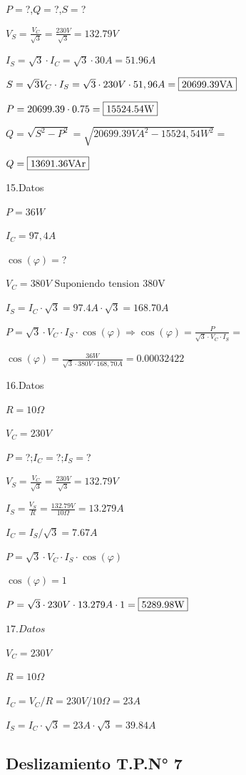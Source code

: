 \documentclass[../main]{subfiles}
\begin{document}
$P=$?,$Q=$?,$S=$?

$V_S=\frac{V_C}{\sqrt{3}}=\frac{230V}{\sqrt{3}}=132.79V$

$I_S=\sqrt{3} \cdot I_C=\sqrt{3}\cdot 30A=51.96A$

$S=\sqrt{3}V_C \cdot I_S=\sqrt{3} \cdot 230V \cdot 51,96A= \fbox{20699.39VA}$

$P=20699.39 \cdot 0.75=\fbox{15524.54W}$

$Q=\sqrt{S^2-P^2}=\sqrt{20699.39VA^2-15524,54W^2}=$

$Q=\fbox{13691.36VAr}$

\vspace{1cm}

15.Datos

$P=36W$

$I_C=97,4A$

$\cos(\varphi)=$?

$V_C=380V \text{ Suponiendo tension 380V}$

$I_S= I_C \cdot \sqrt{3}=97.4 A\cdot \sqrt{3}=168.70A$

$P= \sqrt{3}\cdot V_C\cdot I_S\cdot \cos(\varphi)\Rightarrow
\cos(\varphi)=\frac{P}{\sqrt{3}\cdot V_C\cdot I_S}=$

$\cos(\varphi)=\frac{36W}{\sqrt{3}\cdot 380V\cdot 168,70A}=0.00032422$

\vspace{1cm}

16.Datos

$R=10\Omega$

$V_C=230V$

$P=$?;$I_C=$?;$I_S=$?

$V_S = \frac{V_C}{\sqrt{3}}=\frac{230V}{\sqrt{3}}=132.79V$

$I_S=\frac{V_S}{R}=\frac{132.79V}{10\Omega}=13.279A$

$I_C=I_S/\sqrt{3}=7.67A$

$P= \sqrt{3}\cdot V_C\cdot I_S\cdot \cos(\varphi)$

$\cos(\varphi)=1$

$P= \sqrt{3}\cdot 230V\cdot 13.279A\cdot 1=\fbox{5289.98W}$

\vspace{1cm}

$17.Datos$

$V_C=230V$

$R=10\Omega$

$I_C=V_C/R=230V/10\Omega=23A$

$I_S=I_C\cdot \sqrt{3}=23A\cdot \sqrt{3}=39.84A$

\subsection{Deslizamiento T.P.N° 7}
\end{document}
